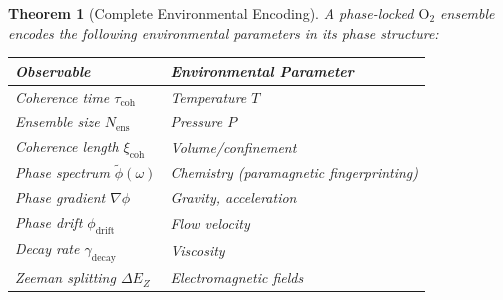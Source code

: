 \documentclass[12pt]{article}
\newtheorem{theorem}{Theorem}[section]
\theoremstyle{definition}
\theoremstyle{remark}
\newcommand{\xicoh}{\xi_{\mathrm{coh}}}
\newcommand{\Nens}{N_{\mathrm{ens}}}
\begin{document}
\begin{theorem}[Complete Environmental Encoding]
\label{thm:env_encoding}
A phase-locked $\mathrm{O}_2$ ensemble encodes the following environmental parameters in its phase structure:
\begin{center}
\begin{tabular}{@{}ll@{}}
\toprule
\textbf{Observable} & \textbf{Environmental Parameter} \\
\midrule
Coherence time $\tau_{\mathrm{coh}}$ & Temperature $T$ \\
Ensemble size $\Nens$ & Pressure $P$ \\
Coherence length $\xicoh$ & Volume/confinement \\
Phase spectrum $\tilde{\phi}(\omega)$ & Chemistry (paramagnetic fingerprinting) \\
Phase gradient $\nabla\phi$ & Gravity, acceleration \\
Phase drift $\phi_{\mathrm{drift}}$ & Flow velocity \\
Decay rate $\gamma_{\mathrm{decay}}$ & Viscosity \\
Zeeman splitting $\Delta E_Z$ & Electromagnetic fields \\
\bottomrule
\end{tabular}
\end{center}
\end{theorem}
\end{document}
